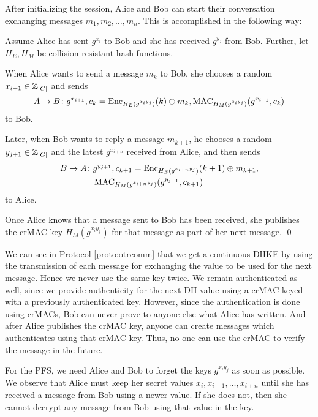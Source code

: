 After initializing the session, Alice and Bob can start their conversation 
exchanging messages \(m_1, m_2, \ldots, m_n\).
This is accomplished in the following way:

\begin{protocol}\label{proto:otrcomm}
  Assume Alice has sent \(g^{x_i}\) to Bob and she has received \(g^{y_j}\) 
  from Bob.
  Further, let \(H_E, H_M\) be collision-resistant hash functions.

  When Alice wants to send a message \(m_k\) to Bob, she chooses a random 
  \(x_{i+1}\in\operatorname{\mathbb Z}_{|G|}\) and sends
  \begin{equation*}
    A\to B\colon g^{x_{i+1}},
    c_k = \operatorname{\mathrm{Enc}}_{H_E( g^{x_i y_j} )}( k )\oplus m_k,
    \operatorname{\mathrm{MAC}}_{H_M( g^{x_i y_j} )}( g^{x_{i+1}}, c_k )
  \end{equation*}
  to Bob.

  Later, when Bob wants to reply a message \(m_{k+1}\), he chooses a random 
  \(y_{j+1}\in\operatorname{\mathbb Z}_{|G|}\) and the latest \(g^{x_{i+n}}\) received from Alice, 
  and then sends
  \begin{align*}
    B\to A\colon& g^{y_{j+1}}, c_{k+1} = \operatorname{\mathrm{Enc}}_{H_E( g^{x_{i+n} y_j} )}( k+1 
    )\oplus m_{k+1}, \\
    & \operatorname{\mathrm{MAC}}_{H_M( g^{x_{i+n} y_j} )}( g^{y_{j+1}}, c_{k+1} )
  \end{align*}
  to Alice.

  Once Alice knows that a message sent to Bob has been received, she publishes 
  the \ac{crMAC} key \( H_M( g^{x_i y_j} ) \) for that message as part of her 
  next message.
  \qed
\end{protocol}

We can see in Protocol \ref{proto:otrcomm} that we get a continuous \ac{DHKE} 
by using the transmission of each message for exchanging the value to be used 
for the next message.
Hence we never use the same key twice.
We remain authenticated as well, since we provide authenticity for the next 
\ac{DH} value using a \ac{crMAC} keyed with a previously authenticated key.
However, since the authentication is done using \acp{crMAC}, Bob can never 
prove to anyone else what Alice has written.
And after Alice publishes the \ac{crMAC} key, anyone can create messages which 
authenticates using that \ac{crMAC} key.
Thus, no one can use the \ac{crMAC} to verify the message in the future.

For the \ac{PFS}, we need Alice and Bob to forget the keys \(g^{x_i y_j}\) as 
soon as possible.
We observe that Alice must keep her secret values \(x_i, x_{i+1}, \ldots, 
x_{i+n}\) until she has received a message from Bob using a newer value.
If she does not, then she cannot decrypt any message from Bob using that value 
in the key.


